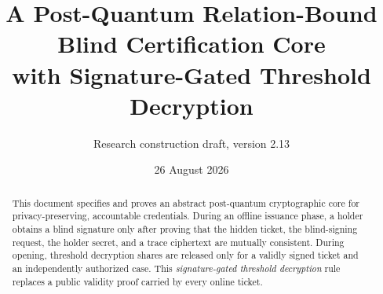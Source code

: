 \documentclass[11pt]{article}
\title{A Post-Quantum Relation-Bound Blind Certification Core\\
with Signature-Gated Threshold Decryption}
\author{Research construction draft, version 2.13}
\date{26 August 2026}
\begin{document}
\maketitle

\begin{abstract}
This document specifies and proves an abstract post-quantum cryptographic core for
privacy-preserving, accountable credentials.  During an offline issuance phase, a
holder obtains a blind signature only after proving that the hidden ticket, the
blind-signing request, the holder secret, and a trace ciphertext are mutually
consistent.  During opening, threshold decryption shares are released only for a
validly signed ticket and an independently authorized case.  This
\emph{signature-gated threshold decryption} rule replaces a public validity proof
carried by every online ticket.


\end{abstract}
\end{document}
